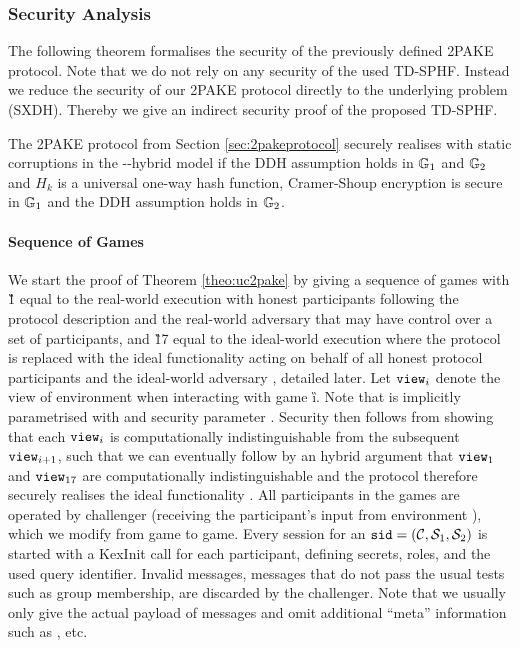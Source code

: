\subsubsection{Security Analysis}\label{sec:2pakeproof}
The following theorem formalises the security of the previously defined \ac{2PAKE} protocol.
Note that we do not rely on any security of the used \ac{TD-SPHF}.
Instead we reduce the security of our \ac{2PAKE} protocol directly to the underlying problem (\ac{SXDH}).
Thereby we give an indirect security proof of the proposed \ac{TD-SPHF}.
 
\begin{theorem}\label{theo:uc2pake}
  The \ac{2PAKE} protocol from Section \ref{sec:2pakeprotocol} securely realises \FTWOPAKEM with static corruptions in the \Fcrs-\Fca-hybrid model if the \ac{DDH} assumption holds in $\mathbb{G}_1$ and $\mathbb{G}_2$ and $H_k$ is a universal one-way hash function, \ie Cramer-Shoup encryption is secure in $\mathbb{G}_1$ and the \ac{DDH} assumption holds in $\mathbb{G}_2$.
\end{theorem}

\paragraph{Sequence of Games}
We start the proof of Theorem \ref{theo:uc2pake} by giving a sequence of games with \G{1} equal to the real-world execution with honest participants following the protocol description and the real-world adversary \cA that may have control over a set of participants, and \G{17} equal to the ideal-world execution where the protocol is replaced with the ideal functionality \FTWOPAKE acting on behalf of all honest protocol participants and the ideal-world adversary \SIM, detailed later.
Let $\mathtt{view}_i$ denote the view of environment \cZ when interacting with game \G{i}.
Note that \view is implicitly parametrised with \sid and security parameter \secpar.
Security then follows from showing that each $\mathtt{view}_i$ is computationally indistinguishable from the subsequent $\mathtt{view}_{i+1}$, such that we can eventually follow by an hybrid argument that $\mathtt{view}_1$ and $\mathtt{view}_{17}$ are computationally indistinguishable and the protocol therefore securely realises the ideal functionality \FTWOPAKE.
All participants in the games are operated by challenger \Challenger (receiving the participant's input from environment \cZ), which we modify from game to game.
Every session for an $\mathtt{sid}=(\mathcal{C}, \mathcal{S}_1, \mathcal{S}_2)$ is started with a KexInit call for each participant, defining secrets, roles, and the used query identifier.
Invalid messages, \ie messages that do not pass the usual tests such as group membership, are discarded by the challenger.
Note that we usually only give the actual payload of messages and omit additional ``meta'' information such as \sid, \qid etc.

